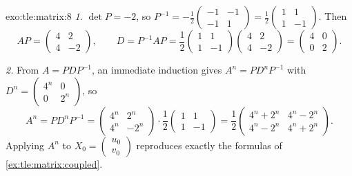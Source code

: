 \begin{solution}{exo:tle:matrix:8}
\emph{1.} $\det P = -2$, so
$P^{-1} = -\frac12\begin{pmatrix} -1 & -1\\ -1 & 1\end{pmatrix}
= \frac12\begin{pmatrix} 1 & 1\\ 1 & -1\end{pmatrix}$. Then
\[
AP = \begin{pmatrix} 4 & 2\\ 4 & -2 \end{pmatrix}, \qquad
D = P^{-1}AP = \frac12\begin{pmatrix} 1&1\\1&-1\end{pmatrix}
\begin{pmatrix} 4&2\\4&-2\end{pmatrix}
= \begin{pmatrix} 4 & 0\\ 0 & 2\end{pmatrix}.
\]

\emph{2.} From $A = PDP^{-1}$, an immediate induction gives
$A^n = PD^nP^{-1}$ with
$D^n = \begin{pmatrix} 4^n & 0\\ 0 & 2^n\end{pmatrix}$, so
\[
A^n = P D^n P^{-1}
= \begin{pmatrix} 4^n & 2^n\\ 4^n & -2^n\end{pmatrix}\cdot
\frac12\begin{pmatrix} 1&1\\1&-1\end{pmatrix}
= \frac12\begin{pmatrix} 4^n + 2^n & 4^n - 2^n\\
4^n - 2^n & 4^n + 2^n\end{pmatrix}.
\]
Applying $A^n$ to $X_0 = \begin{pmatrix} u_0\\v_0\end{pmatrix}$ reproduces
exactly the formulas of \cref{ex:tle:matrix:coupled}.
\end{solution}
